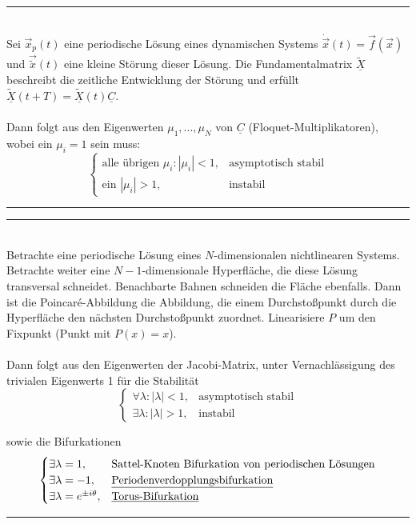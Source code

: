 \documentclass{article}
\begin{document}
\vspace*{0.5cm}

\hrule
	\\
	Sei $\vec{x}_p(t)$ eine periodische Lösung eines dynamischen Systems $\dot{\vec{x}}(t) = \vec{f}(\vec{x})$ und $\vec{\tilde{x}}(t)$ eine kleine Störung dieser Lösung. Die Fundamentalmatrix $\tilde{\underline{X}}$ beschreibt die zeitliche Entwicklung der Störung und erfüllt $\tilde{\underline{X}}(t+T) = \tilde{\underline{X}}(t) \underline{C}$.\\
\\
Dann folgt aus den Eigenwerten $\mu_1, ..., \mu_N$ von $\underline{C}$ (Floquet-Multiplikatoren), wobei ein $\mu_i=1$ sein muss:
	\begin{equation}
		\begin{cases}
			\text{alle übrigen } \mu_i: |\mu_i|<1, & \text{asymptotisch stabil} \\
			\text{ein $|\mu_i|>1$}, & \text{instabil}
		\end{cases}
	\end{equation}
\hrule

\vspace{0.5cm}

\hrule
	\\
	Betrachte eine periodische Lösung eines $N$-dimensionalen nichtlinearen Systems. Betrachte weiter eine $N-1$-dimensionale Hyperfläche, die diese Lösung transversal schneidet. Benachbarte Bahnen schneiden die Fläche ebenfalls. Dann ist die Poincaré-Abbildung die Abbildung, die einem Durchstoßpunkt durch die Hyperfläche den nächsten Durchstoßpunkt zuordnet. Linearisiere $P$ um den Fixpunkt (Punkt mit $P(x)=x$).\\
	 \\
	 Dann folgt aus den Eigenwerten der Jacobi-Matrix, unter Vernachlässigung des trivialen Eigenwerts 1 für die Stabilität
		\begin{equation}
			\begin{cases}
				\forall \lambda: |\lambda| < 1, & \text{asymptotisch stabil} \\
				\exists \lambda: |\lambda| > 1, & \text{instabil}
			\end{cases}
		\end{equation}

	sowie die Bifurkationen
		\begin{equation}
			\begin{cases}
				\exists \lambda = 1, & \text{Sattel-Knoten Bifurkation von periodischen Lösungen} \\
				\exists \lambda = -1, & \text{\underline{Periodenverdopplungsbifurkation}} \\
				\exists \lambda = e^{\pm i \theta}, & \text{\underline{Torus-Bifurkation}} \\
			\end{cases}
		\end{equation}
\hrule
\end{document}
